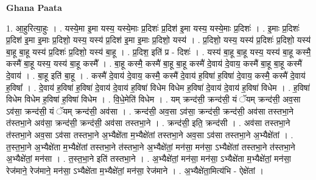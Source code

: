 \documentclass[17pt]{extarticle}
\begin{document}
\textbf{Ghana Paata } \newline

1. आ॒हुरित्या॒हुः । . यस्ये॒मा इ॒मा यस्य॒ यस्ये॒माः प्र॒दिशः॑ प्र॒दिश॑ इ॒मा यस्य॒ यस्ये॒माः प्र॒दिशः॑ । . इ॒माः प्र॒दिशः॑ प्र॒दिश॑ इ॒मा इ॒माः प्र॒दिशो॒ यस्य॒ यस्य॑ प्र॒दिश॑ इ॒मा इ॒माः प्र॒दिशो॒ यस्य॑ । . प्र॒दिशो॒ यस्य॒ यस्य॑ प्र॒दिशः॑ प्र॒दिशो॒ यस्य॑ बा॒हू बा॒हू यस्य॑ प्र॒दिशः॑ प्र॒दिशो॒ यस्य॑ बा॒हू । . प्र॒दिश॒ इति॑ प्र - दिशः॑ । . यस्य॑ बा॒हू बा॒हू यस्य॒ यस्य॑ बा॒हू कस्मै॒ कस्मै॑ बा॒हू यस्य॒ यस्य॑ बा॒हू कस्मै᳚ । . बा॒हू कस्मै॒ कस्मै॑ बा॒हू बा॒हू कस्मै॑ दे॒वाय॑ दे॒वाय॒ कस्मै॑ बा॒हू बा॒हू कस्मै॑ दे॒वाय॑ । . बा॒हू इति॑ बा॒हू । . कस्मै॑ दे॒वाय॑ दे॒वाय॒ कस्मै॒ कस्मै॑ दे॒वाय॑ ह॒विषा॑ ह॒विषा॑ दे॒वाय॒ कस्मै॒ कस्मै॑ दे॒वाय॑ ह॒विषा᳚ । . दे॒वाय॑ ह॒विषा॑ ह॒विषा॑ दे॒वाय॑ दे॒वाय॑ ह॒विषा॑ विधेम विधेम ह॒विषा॑ दे॒वाय॑ दे॒वाय॑ ह॒विषा॑ विधेम । . ह॒विषा॑ विधेम विधेम ह॒विषा॑ ह॒विषा॑ विधेम । . वि॒धे॒मेति॑ विधेम । . यम् क्रन्द॑सी॒ क्रन्द॑सी॒ यं ॅयम् क्रन्द॑सी॒ अव॒सा ऽव॑सा॒ क्रन्द॑सी॒ यं ॅयम् क्रन्द॑सी॒ अव॑सा । . क्रन्द॑सी॒ अव॒सा ऽव॑सा॒ क्रन्द॑सी॒ क्रन्द॑सी॒ अव॑सा तस्तभा॒ने त॑स्तभा॒ने अव॑सा॒ क्रन्द॑सी॒ क्रन्द॑सी॒ अव॑सा तस्तभा॒ने । . क्रन्द॑सी॒ इति॒ क्रन्द॑सी । . अव॑सा तस्तभा॒ने त॑स्तभा॒ने अव॒सा ऽव॑सा तस्तभा॒ने अ॒भ्यैक्षे॑ता म॒भ्यैक्षे॑तां तस्तभा॒ने अव॒सा ऽव॑सा तस्तभा॒ने अ॒भ्यैक्षे॑तां । . त॒स्त॒भा॒ने अ॒भ्यैक्षे॑ता म॒भ्यैक्षे॑तां तस्तभा॒ने त॑स्तभा॒ने अ॒भ्यैक्षे॑तां॒ मन॑सा॒ 
मन॑सा॒ ऽभ्यैक्षे॑तां तस्तभा॒ने त॑स्तभा॒ने अ॒भ्यैक्षे॑तां॒ मन॑सा । . त॒स्त॒भा॒ने इति॑ तस्तभा॒ने । . अ॒भ्यैक्षे॑तां॒ मन॑सा॒ मन॑सा॒ ऽभ्यैक्षे॑ता म॒भ्यैक्षे॑तां॒ मन॑सा॒ रेज॑माने॒ रेज॑माने॒ 
मन॑सा॒ ऽभ्यैक्षे॑ता म॒भ्यैक्षे॑तां॒ मन॑सा॒ रेज॑माने । . अ॒भ्यैक्षे॑ता॒मित्य॑भि - ऐक्षे॑तां । \newline
\end{document}
